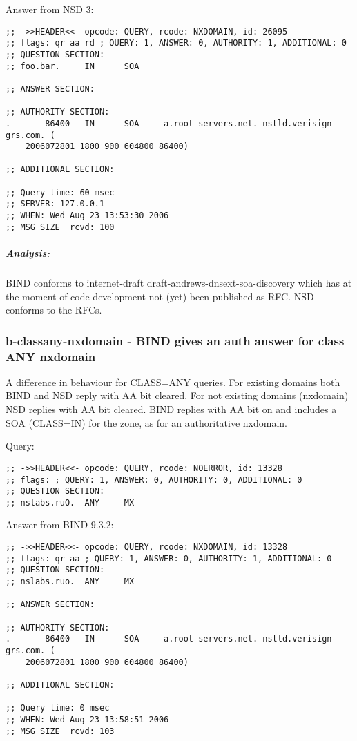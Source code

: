 \documentclass[twoside,titlepage,english]{nlnetlabs}
\begin{document}
Answer from NSD 3:

\footnotesize
\begin{verbatim}
;; ->>HEADER<<- opcode: QUERY, rcode: NXDOMAIN, id: 26095
;; flags: qr aa rd ; QUERY: 1, ANSWER: 0, AUTHORITY: 1, ADDITIONAL: 0
;; QUESTION SECTION:
;; foo.bar.     IN      SOA

;; ANSWER SECTION:

;; AUTHORITY SECTION:
.       86400   IN      SOA     a.root-servers.net. nstld.verisign-grs.com. (
	2006072801 1800 900 604800 86400)

;; ADDITIONAL SECTION:

;; Query time: 60 msec
;; SERVER: 127.0.0.1
;; WHEN: Wed Aug 23 13:53:30 2006
;; MSG SIZE  rcvd: 100
\end{verbatim}
\normalsize

\vspace{-8pt}\subparagraph{Analysis:}

BIND conforms to internet-draft draft-andrews-dnsext-soa-discovery which 
has at the moment of code development not (yet) been published as RFC. 
NSD conforms to the RFCs.


\subsubsection{b-classany-nxdomain - BIND gives an auth answer for class ANY nxdomain}
\label{b-classany-nxdomain}

A difference in behaviour for CLASS=ANY queries. For existing domains both
BIND and NSD reply with AA bit cleared. For not existing domains (nxdomain)
NSD replies with AA bit cleared. BIND replies with AA bit on and includes a
SOA (CLASS=IN) for the zone, as for an authoritative nxdomain.

Query:

\footnotesize
\begin{verbatim}
;; ->>HEADER<<- opcode: QUERY, rcode: NOERROR, id: 13328
;; flags: ; QUERY: 1, ANSWER: 0, AUTHORITY: 0, ADDITIONAL: 0
;; QUESTION SECTION:
;; nslabs.ruO.  ANY     MX
\end{verbatim}
\normalsize

Answer from BIND 9.3.2:

\footnotesize
\begin{verbatim}
;; ->>HEADER<<- opcode: QUERY, rcode: NXDOMAIN, id: 13328
;; flags: qr aa ; QUERY: 1, ANSWER: 0, AUTHORITY: 1, ADDITIONAL: 0
;; QUESTION SECTION:
;; nslabs.ruo.  ANY     MX

;; ANSWER SECTION:

;; AUTHORITY SECTION:
.       86400   IN      SOA     a.root-servers.net. nstld.verisign-grs.com. (
	2006072801 1800 900 604800 86400)

;; ADDITIONAL SECTION:

;; Query time: 0 msec
;; WHEN: Wed Aug 23 13:58:51 2006
;; MSG SIZE  rcvd: 103
\end{verbatim}
\normalsize
\end{document}
